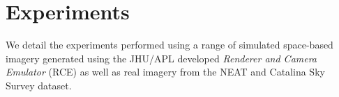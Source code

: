 \section{Experiments}
%
%
%
%
%

\label{sec:experiments}

We detail the experiments performed using a range of simulated space-based imagery generated using the JHU/APL developed {\em Renderer and Camera Emulator} (RCE) as well as real imagery from the NEAT and Catalina Sky Survey dataset.  


